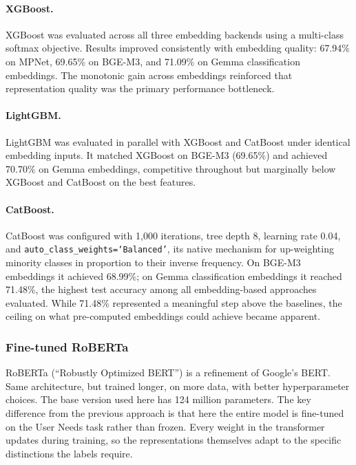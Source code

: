 \documentclass[11pt]{article}
\begin{document}
\paragraph{XGBoost.}
XGBoost was evaluated across all three embedding backends using a multi-class softmax objective. Results improved consistently with embedding quality: 67.94\% on MPNet, 69.65\% on BGE-M3, and 71.09\% on Gemma classification embeddings. The monotonic gain across embeddings reinforced that representation quality was the primary performance bottleneck.
 
\paragraph{LightGBM.}
LightGBM was evaluated in parallel with XGBoost and CatBoost under identical embedding inputs. It matched XGBoost on BGE-M3 (69.65\%) and achieved 70.70\% on Gemma embeddings, competitive throughout but marginally below XGBoost and CatBoost on the best features.
 
\paragraph{CatBoost.}
CatBoost was configured with 1{,}000 iterations, tree depth 8, learning rate 0.04, and \texttt{auto\_class\_weights=`Balanced'}, its native mechanism for up-weighting minority classes in proportion to their inverse frequency. On BGE-M3 embeddings it achieved 68.99\%; on Gemma classification embeddings it reached 71.48\%, the highest test accuracy among all embedding-based approaches evaluated. While 71.48\% represented a meaningful step above the baselines, the ceiling on what pre-computed embeddings could achieve became apparent.

\subsubsection{Fine-tuned RoBERTa}

RoBERTa (``Robustly Optimized BERT'') \cite{RoBERTaaaaa} is a refinement of Google's BERT. Same architecture, but trained longer, on more data, with better hyperparameter choices. The base version used here has 124 million parameters. The key difference from the previous approach is that here the entire model is fine-tuned on the User Needs task rather than frozen. Every weight in the transformer updates during training, so the representations themselves adapt to the specific distinctions the labels require.
\end{document}
